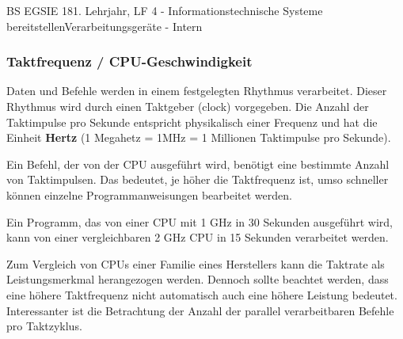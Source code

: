 \documentclass[oneside,openany,headings=optiontotoc,11pt,numbers=noenddot]{article}
\begin{document}
\begin{worksheet}{BS EGSIE 18}{1. Lehrjahr, LF 4 - Informationstechnische Systeme bereitstellen}{Verarbeitungsgeräte - Intern}
		\subsubsection*{Taktfrequenz / CPU-Geschwindigkeit}
		Daten und Befehle werden in einem festgelegten Rhythmus verarbeitet. Dieser Rhythmus wird durch einen Taktgeber (clock) vorgegeben. Die Anzahl der Taktimpulse pro Sekunde entspricht physikalisch einer Frequenz und hat die Einheit \textbf{Hertz} (1 Megahetz = 1MHz = 1 Millionen Taktimpulse pro Sekunde).\\
		\par\noindent
		Ein Befehl, der von der CPU ausgeführt wird, benötigt eine bestimmte Anzahl von Taktimpulsen. Das bedeutet, je höher die Taktfrequenz ist, umso schneller können einzelne Programmanweisungen bearbeitet werden.
		\begin{framed}
			\noindent
			Ein Programm, das von einer CPU mit 1 GHz in 30 Sekunden ausgeführt wird, kann von einer vergleichbaren 2 GHz CPU in 15 Sekunden verarbeitet werden.
		\end{framed}
		\noindent
		Zum Vergleich von CPUs einer Familie eines Herstellers kann die Taktrate als Leistungsmerkmal herangezogen werden. Dennoch sollte beachtet werden, dass eine höhere Taktfrequenz nicht automatisch auch eine höhere Leistung bedeutet. Interessanter ist die Betrachtung der Anzahl der parallel verarbeitbaren Befehle pro Taktzyklus.\\
	\end{worksheet}
\end{document}
